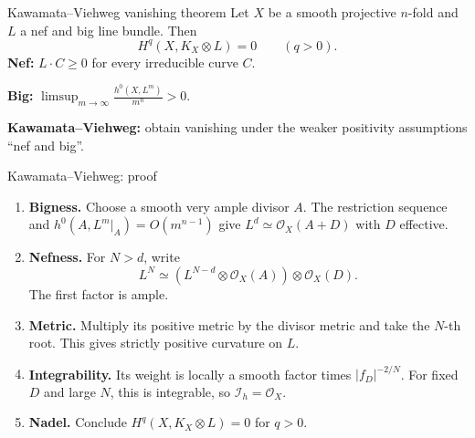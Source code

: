 \documentclass[aspectratio=169,11pt]{beamer}
\newcommand{\cI}{\mathcal I}
\newcommand{\cO}{\mathcal O}
\begin{document}
\begin{frame}{Kawamata--Viehweg vanishing theorem}
Let \(X\) be a smooth projective \(n\)-fold and \(L\) a nef and big
line bundle. Then
\[
\boxed{H^q(X,K_X\otimes L)=0\qquad(q>0).}
\]
\textbf{Nef:} \(L\cdot C\ge0\) for every irreducible curve \(C\).
\medskip

\textbf{Big:} \(\displaystyle\limsup_{m\to\infty}
\frac{h^0(X,L^m)}{m^n}>0\).
\medskip

\textbf{Kawamata--Viehweg:} obtain vanishing under the weaker
positivity assumptions \textquotedblleft nef and big\textquotedblright.
\end{frame}

\begin{frame}{Kawamata--Viehweg: proof}
\small
\begin{enumerate}
\setlength{\itemsep}{7pt}
\item \textbf{Bigness.} Choose a smooth very ample divisor \(A\).
The restriction sequence and
\(h^0(A,L^m|_A)=O(m^{n-1})\) give
\(L^d\simeq\cO_X(A+D)\) with \(D\) effective.
\item \textbf{Nefness.} For \(N>d\), write
\[
L^N\simeq(L^{N-d}\otimes\cO_X(A))\otimes\cO_X(D).
\]
The first factor is ample.
\item \textbf{Metric.} Multiply its positive metric by the divisor
metric and take the \(N\)-th root. This gives strictly positive curvature on \(L\).
\item \textbf{Integrability.} Its weight is locally a smooth factor
times \(|f_D|^{-2/N}\). For fixed \(D\) and large \(N\), this is
integrable, so \(\cI_h=\cO_X\).
\item \textbf{Nadel.} Conclude \(H^q(X,K_X\otimes L)=0\) for \(q>0\).
\end{enumerate}
\end{frame}
\end{document}
